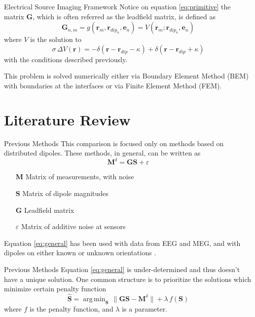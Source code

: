 \documentclass[progressbar=head]{beamer}
\newcommand{\ppar}[1]{ \left( #1 \right) }
\DeclareMathOperator*{\argmin}{arg\,min}
\newcommand{\nnorm}[1]{\lVert #1 \rVert}
\newcommand{\G}{\mathbf{G}}
\newcommand{\rr}{\mathbf{r}}
\begin{document}
\begin{frame}{Electrical Source Imaging Framework}
Notice on equation \eqref{eq:primitive} the matrix $\G$, which is often referred as the \alert{leadfield matrix}, is defined as
\begin{equation*}
    \mathbf{G}_{n,m} =
    g\ppar{\rr_m, \rr_{dip_{n}}, \mathbf{e}_{n}} =
    V\ppar{\rr_m; \rr_{dip_{n}}, \mathbf{e}_{n}}
\end{equation*}
where $V$ is the solution to 
\begin{equation}
\sigma\,
\Delta V(\rr)
= 
-\delta\ppar{\rr-\rr_{dip}-\kappa} + \delta\ppar{\rr-\rr_{dip}+\kappa}
\end{equation}
with the conditions described previously.

This problem is solved numerically either via Boundary Element Method (BEM) with boundaries at the interfaces or via Finite Element Method (FEM).
\end{frame}

{
\section{Literature Review}
}

\begin{frame}{Previous Methods}
This comparison is focused only on methods based on distributed dipoles. These methods, in general, can be written as
\begin{equation}
    \mathbf{M}^\delta = \mathbf{G} \mathbf{S} + \varepsilon
    \label{eq:general}
\end{equation}
\begin{itemize}
    \item[$\mathbf{M}$] Matrix of measurements, with noise
    \item[$\mathbf{S}$] Matrix of dipole magnitudes
    \item[$\mathbf{G}$] Leadfield matrix
    \item[$\varepsilon$] Matrix of additive noise at sensors
\end{itemize}

Equation \eqref{eq:general} has been used with %
data from EEG and MEG, and with 
dipoles on either known or unknown orientations
\cite{grech2008review}.

\end{frame}

\begin{frame}{Previous Methods}
Equation \eqref{eq:general} is under-determined and thus doesn't have a unique solution. One common structure is to prioritize the solutions which minimize certain penalty function
\begin{equation}
    \hat{\mathbf{S}} = \argmin_{\mathbf{S}}\, \nnorm{\G \mathbf{S}-\mathbf{M}^\delta} + \lambda\, f\ppar{\mathbf{S}}
    \label{eq:general_min}
\end{equation}
where $f$ is the penalty function, and $\lambda$ is a parameter.

\end{frame}
\end{document}
